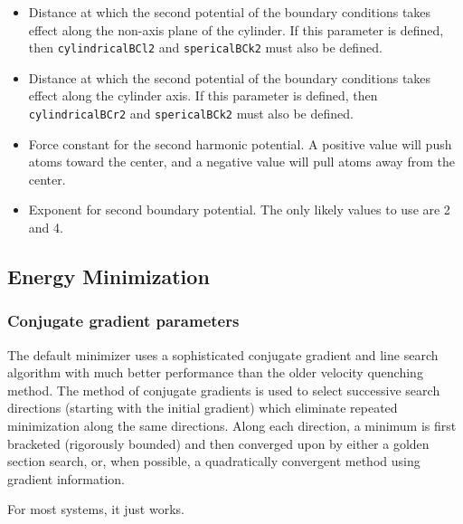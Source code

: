 \begin{itemize}
\item
{}
{Distance at which the second potential of the boundary conditions takes
effect along the non-axis plane of the cylinder.
If this parameter is defined, then {\tt cylindricalBCl2} and {\tt spericalBCk2} must also
be defined.}

\item
{}
{Distance at which the second potential of the boundary conditions takes
effect along the cylinder axis.
If this parameter is defined, then {\tt cylindricalBCr2} and {\tt spericalBCk2} must also
be defined.}

\item
{}
{Force constant for the second harmonic potential.  A positive
value will push atoms toward the center, and a negative
value will pull atoms away from the center.}

\item
{}
{Exponent for second boundary potential.  The only likely values to
use are 2 and 4.}

\end{itemize}


\subsection{Energy Minimization}

\subsubsection{Conjugate gradient parameters}

The default minimizer uses a sophisticated conjugate gradient and
line search algorithm with much better performance than the older
velocity quenching method.
The method of conjugate gradients is used to select successive search
directions (starting with the initial gradient) which eliminate
repeated minimization along the same directions.
Along each direction, a minimum is first bracketed (rigorously bounded)
and then converged upon by either a golden section search, or, when
possible, a quadratically convergent method using gradient information.

For most systems, it just works.

